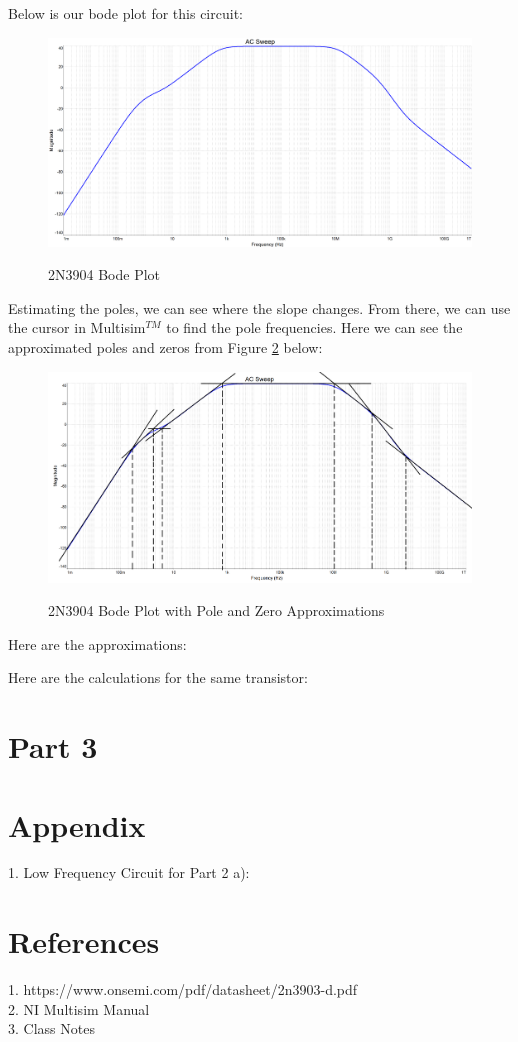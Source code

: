 \documentclass[12pt]{article}
\begin{document}
Below is our bode plot for this circuit:

\begin{figure}[H]
\centering
\includegraphics[height=0.35\textwidth]{Images/part2a.png}\\
\caption{2N3904 Bode Plot}
\label{fig:part2a_bodeplot}
\end{figure}
Estimating the poles, we can see where the slope changes. From there, we can use the cursor in Multisim$^{TM}$ to find the pole frequencies. Here we can see the approximated poles and zeros from Figure \ref{fig:part2a_bodeplot_approximations} below:
\begin{figure}[H]
\centering
\includegraphics[height=0.35\textwidth]{Images/2abode_approximations.png}\\
\caption{2N3904 Bode Plot with Pole and Zero Approximations}
\label{fig:part2a_bodeplot_approximations}
\end{figure}
Here are the approximations:

Here are the calculations for the same transistor:




\section{Part 3}

\section{Appendix}

1. Low Frequency Circuit for Part 2 a):

\section{References}
\textrm {1. https://www.onsemi.com/pdf/datasheet/2n3903-d.pdf}\\
\textrm{2. NI Multisim Manual}\\
\textrm{3. Class Notes}\\
\end{document}
